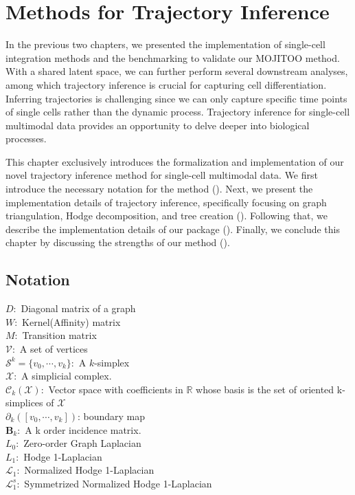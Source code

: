 %
\chapter{Methods for Trajectory Inference}
\label{chapter:methods_TI}
\graphicspath{{chapter5/figs}}

In the previous two chapters, we presented the implementation of single-cell integration methods and the benchmarking to validate our MOJITOO method. With a shared latent space, we can further perform several downstream analyses, among which trajectory inference is crucial for capturing cell differentiation. Inferring trajectories is challenging since we can only capture specific time points of single cells rather than the dynamic process. Trajectory inference for single-cell multimodal data provides an opportunity to delve deeper into biological processes.

This chapter exclusively introduces the formalization and implementation of our novel trajectory inference method for single-cell multimodal data. We first introduce the necessary notation for the method (). Next, we present the implementation details of trajectory inference, specifically focusing on graph triangulation, Hodge decomposition, and tree creation (). Following that, we describe the implementation details of our package (). Finally, we conclude this chapter by discussing the strengths of our method ().


\section{Notation} \label{TI_methods:notation}

$D: $ Diagonal matrix of a graph\\
$W: $ Kernel(Affinity) matrix \\
$M: $ Transition matrix \\
$\mathcal{V}: $ A set of vertices\\
$\mathcal{S}^k = \{{v}_0,\cdots,{v}_k \}: $ A $k$-simplex\\
$\mathcal{X}: $ A simplicial complex.\\
$\mathcal{C}_k(\mathcal{X}): $ Vector space with coefficients in $\mathbb{R}$ whose basis is the set of oriented k-simplices of $\mathcal{X}$\\
$\partial_k ([v_0,\cdots, v_k])$: boundary map\\
$\mathbf{B}_k: $ A k order incidence matrix.\\
$L_0: $ Zero-order Graph Laplacian\\
$L_1: $ Hodge 1-Laplacian\\
$\mathcal{L}_1: $ Normalized Hodge 1-Laplacian\\
$\mathcal{L}_1^s: $ Symmetrized Normalized Hodge 1-Laplacian\\
